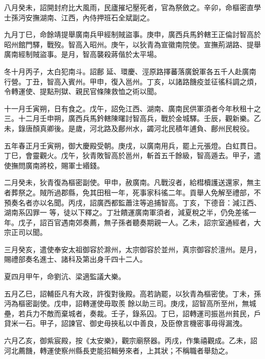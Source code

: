 \begin{pinyinscope}
 八月癸未，詔開封府比大風雨，民廬摧圮壓死者，官為祭斂之。辛卯，命樞密直學士孫沔安撫湖南、江西，內侍押班石全斌副之。



 九月丁巳，命餘靖提舉廣南兵甲經制賊盜事。庚申，廣西兵馬鈐轄王正倫討智高於昭州館門驛，戰歿。智高入昭州。庚午，以狄青為宣徽南院使。宣撫荊湖路、提舉廣南經制賊盜事。是月，智高襲殺蔣偕於太平場。



 冬十月丙子，太白犯南斗。詔鄜
 延、環慶、涇原路擇蕃落廣銳軍各五千人赴廣南行營。丁丑，智高入賓州。甲申，復入邕州。丁亥，以諸路饑疫並征徭科調之煩，令轉運使、提點刑獄、親民官條陳救恤之術以聞。



 十一月壬寅朔，日有食之。戊午，詔免江西、湖南、廣南民供軍須者今年秋租十之三。十二月壬申朔，廣西兵馬鈐轄陳曙討智高兵，戰於金城驛。壬辰，觀新樂。乙未，錄唐顏真卿後。是歲，河北路及鄜州水，蠲河北民積年逋負、鄜州民稅役。



 五年春正月壬寅朔，御大慶殿受朝。庚戌，以廣南用兵，罷上元張燈。白虹貫日。丁巳，會靈觀火。戊午，狄青敗智高於邕州，斬首五千餘級，智高遁去。甲子，遣使撫問廣南將校，賜軍士緡錢。



 二月癸未，狄青復為樞密副使。甲申，赦廣南。凡戰沒者，給槥櫝護送還家，無主者葬祭之。賊所過郡縣，免其田租一年，死事家科徭二年。貢舉人免解至禮部，不預奏名者亦以名聞。丙戌，詔廣西都監蕭注等追捕智高。丁亥，下德音：減江西、湖南系囚罪一
 等，徒以下釋之。丁壯饋運廣南軍須者，減夏稅之半，仍免差徭一年。戊子，詔百官遇南郊奏薦，無子孫者聽奏期親一人。乙未，詔宗室通經者，大宗正司以聞。



 三月癸亥，遣使奉安太祖御容於滁州，太宗御容於並州，真宗御容於澶州。是月，賜禮部奏名進士、諸科及第出身千四十二人。



 夏四月甲午，命劉沆、梁適監議大樂。



 五月乙巳，詔輔臣凡有大政，許復對後殿。高若訥罷，以狄青為樞密使。丁未，孫沔為樞密副使。戊申，詔轉運使毋取羨
 餘以助三司。庚戌，詔智高所至州，無城壘，若兵力不敵而棄城者，奏裁。壬子，錄系囚。丁巳，詔轉運司振邕州貧民，戶貸米一石。甲子，詔諫官、御史毋挾私以中善良，及臣僚言機密事毋得漏洩。



 六月乙亥，御紫宸殿，按《太安樂》，觀宗廟祭器。丙戌，作集禧觀成。乙未，詔河北薦饑，轉運使察州縣長吏能招輯勞來者，上其狀；不稱職者舉劾之。




\end{pinyinscope}
